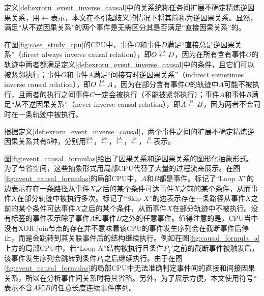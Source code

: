 定义\ref{def:exroru_event_inverse_causal}中的关系统称任务间扩展不确定精炼逆因果关系，用$\leftarrow$表示，本文在不引起歧义的情况下将其简称为逆因果关系。显然，满足“从不逆因果关系”的两个事件是无需区分其是否满足“直接因果关系”的。

\begin{example}\label{ex:exroru_event_inverse_causal}
在图\ref{fig:case_study_cpu}的CPU中，事件$O$和事件$D$满足“直接总是逆因果关系”（direct always inverse causal relation），即$O\overset{\text{\tiny{DA}}}{\leftarrow}D$，因为在所有含有事件$O$的轨迹中两者都满足定义\ref{def:exroru_event_inverse_causal}中的条件，且它们可以被紧邻执行；事件$O$和事件$A$满足“间接有时逆因果关系”（indirect sometimes inverse causal relation），即$O\overset{\text{\tiny{IS}}}{\leftarrow}A$，因为在部分含有事件$O$的轨迹中$A$可能不被执行，且两者的执行之间事件$C$一定会被执行（不能被紧邻执行）；事件$A$和事件$B$满足“从不逆因果关系”（never inverse causal relation），即$A\overset{\text{\tiny{N}}}{\leftarrow}B$，因为两者不会同时在一条轨迹中被执行。
\end{example}

根据定义\ref{def:exroru_event_inverse_causal}，两个事件之间的扩展不确定精炼逆因果关系共有5种，分别用$\overset{\text{\tiny{DA}}}{\leftarrow}$，$\overset{\text{\tiny{DS}}}{\leftarrow}$，$\overset{\text{\tiny{IA}}}{\leftarrow}$，$\overset{\text{\tiny{IS}}}{\leftarrow}$，$\overset{\text{\tiny{N}}}{\leftarrow}$表示。

图\ref{fig:event_causal_formulas}给出了因果关系和逆因果关系的图形化抽象形式。为了节省空间，这些抽象形式用局部CPU代替了大量的过程流来展示。在图\ref{fig:event_causal_formulas}的局部CPU中，$A$和$B$都是事件。标记了“Loop $X$”的边表示存在一条路径从事件$X$之后的某个条件可达事件$X$之前的某个条件，从而事件$X$在部分轨迹中被执行多次。标记了“Skip $X$”的边表示存在一条路径从事件$X$之前的某个条件可达事件$X$之后的某个条件，从而事件$X$在部分轨迹中不被执行。没有标签的事件表示除了事件$A$和事件$B$之外的任意事件。值得注意的是，CPU当中没有XOR-join节点的存在并不意味着该CPU的事件发生序列会在截断事件后停止，而是会跳转到其关联事件后的结构继续执行。例如在图\ref{fig:causal_formula_a}上方的局部CPU中，若“Loop A”结构被执行且条件$P_{1}'$之前的截断事件被触发后，该事件发生序列会跳转到条件$P_{1}$之后继续执行。由于在图\ref{fig:event_causal_formulas}的局部CPU中无法准确判定事件间的直接和间接因果关系，所以在分析事件间关系时将其省略。另外，为了展示方便，本文使用符号$*$表示不含$A$和$B$的任意长度连续事件序列。

